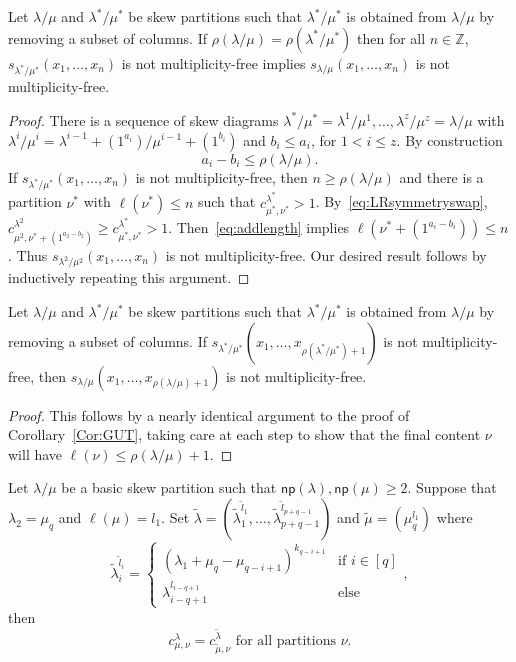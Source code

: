 \documentclass[ALCO,ThmDefs,Unicode,epreuves]{cedram}
\newcommand{\np}{\mathsf{np}}
\newcommand\integers{{\mathbb Z}}
\begin{document}
\begin{coro}\label{Cor:GUT}
Let $\lambda/\mu$ and $\lambda^{*}/\mu^{*}$ be skew partitions such that $\lambda^{*}/\mu^{*}$ is obtained from $\lambda/\mu$ by removing a subset of columns. If $\rho(\lambda/\mu) = \rho(\lambda^{*}/\mu^{*})$ then for all $n\in \integers$, $s_{\lambda^{*}/\mu^{*}}(x_1,\ldots,x_n)$ is not multiplicity-free implies $s_{\lambda/\mu}(x_1,\ldots,x_n)$ is not multiplicity-free.
\end{coro}
\begin{proof} There is a sequence of skew diagrams $\lambda^{*}/\mu^{*}=\lambda^1/\mu^1,\ldots,\lambda^z/\mu^z=\lambda/\mu$ with $\lambda^i / \mu^i = \lambda^{i-1} + (1^{a_i}) / \mu^{i-1} + (1^{b_i})$ and $b_i \leq a_i$, for $1<i\leq z$. By construction
\begin{equation}
\label{eq:addlength}
a_i - b_i \leq \rho(\lambda/\mu).
\end{equation}
If $s_{\lambda^{*}/\mu^{*}}(x_1,\ldots,x_n)$ is not multiplicity-free, then $n \geq \rho(\lambda/\mu)$ and there is a partition $\nu^{*}$ with $\ell(\nu^{*}) \leq n$ such that $c^{\lambda^{*}}_{\mu^{*},\nu^{*}} > 1$. By~\eqref{eq:LRsymmetryswap}, $c^{\lambda^2}_{\mu^2,\nu^{*} + (1^{a_2 - b_2}) } \geq c^{\lambda^{*}}_{\mu^{*},\nu^{*}} > 1$. Then~\eqref{eq:addlength} implies $\ell(\nu^{*} + (1^{a_i - b_i})) \leq n$. Thus $s_{\lambda^2/\mu^2}(x_1,\ldots,x_n)$ is not multiplicity-free. Our desired result follows by inductively repeating this argument.
\end{proof}

\begin{coro}\label{Cor:GUT2}
Let $\lambda/\mu$ and $\lambda^{*}/\mu^{*}$ be skew partitions such that $\lambda^{*}/\mu^{*}$ is obtained from $\lambda/\mu$ by removing a subset of columns. If $s_{\lambda^{*}/\mu^{*}}(x_1,\ldots,x_{\rho(\lambda^{*}/\mu^{*}) + 1})$ is not multiplicity-free, then $s_{\lambda/\mu}(x_1,\ldots,x_{\rho(\lambda/\mu)+1})$ is not multiplicity-free.
\end{coro}
\begin{proof}
This follows by a nearly identical argument to the proof of Corollary~\ref{Cor:GUT}, taking care at each step to show that the final content $\nu$ will have $\ell(\nu) \leq \rho(\lambda/\mu) + 1$.
\end{proof}

\begin{lemma}\label{Lemma:switchingcol}
 Let $\lambda/\mu$ be a basic skew partition such that ${\np }(\lambda),{\np }(\mu)\geq 2$. Suppose that $\lambda_2 = \mu_q$ and $\ell(\mu) = l_1$. Set $\tilde\lambda = (\tilde\lambda_1^{\tilde l_1}, \ldots, \tilde\lambda_{p+q-1}^{\tilde l_{p+q-1}})$ and $\tilde\mu = (\mu_q^{l_1})$ where 
 \[
\tilde\lambda_i^{\tilde l_i} = 
 \begin{cases}
 (\lambda_1+\mu_q-\mu_{q-i+1})^{k_{q-i+1}} & \text{if }i\in [q]\\
 \lambda_{i-q+1}^{l_{i-q+1}} & \text{else}
 \end{cases},
\] 
then
 \[
c^{\lambda}_{\mu,\nu} = c^{\tilde\lambda}_{\tilde\mu,\nu} \text{ for all partitions $\nu$}.
\]
 
\end{lemma}
\end{document}

